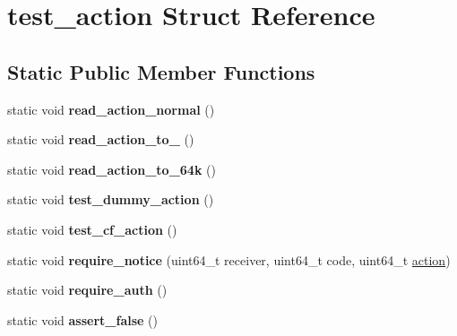 \hypertarget{structtest__action}{}\section{test\+\_\+action Struct Reference}
\label{structtest__action}
\subsection*{Static Public Member Functions}
\begin{DoxyCompactItemize}
\item 
\mbox{\label{structtest__action_a1e79b4854f97d0a5711f9a2b3573c8ce}} 
static void {\bfseries read\+\_\+action\+\_\+normal} ()
\item 
\mbox{\label{structtest__action_a39674bb007a562f4908d446099c249a2}} 
static void {\bfseries read\+\_\+action\+\_\+to\+\_} ()
\item 
\mbox{\label{structtest__action_ac27ffff9537e8e70fa33efddd5f08d14}} 
static void {\bfseries read\+\_\+action\+\_\+to\+\_\+64k} ()
\item 
\mbox{\label{structtest__action_aca75c83e11edd2aead4b9ab2fcaeb9de}} 
static void {\bfseries test\+\_\+dummy\+\_\+action} ()
\item 
\mbox{\label{structtest__action_a7357cdb1d96242a72ac39d725b9a3503}} 
static void {\bfseries test\+\_\+cf\+\_\+action} ()
\item 
\mbox{\label{structtest__action_a9b98f38d40aad576b85b31cb83e1d3ac}} 
static void {\bfseries require\+\_\+notice} (uint64\+\_\+t receiver, uint64\+\_\+t code, uint64\+\_\+t \mbox{\hyperlink{structaction}{action}})
\item 
\mbox{\label{structtest__action_a435dec5b925e90f129d7aeb90c06f4d9}} 
static void {\bfseries require\+\_\+auth} ()
\item 
\mbox{\label{structtest__action_a24f0b8b86d7688c006f1def35c6594d6}} 
static void {\bfseries assert\+\_\+false} ()
\item 

\end{DoxyCompactItemize}
